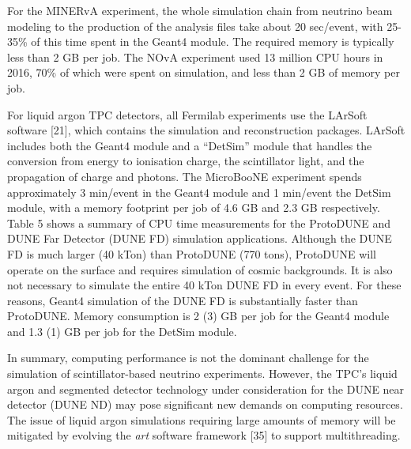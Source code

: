 \documentclass[12pt,a4paper]{article}
\begin{document}
For the MINERvA experiment, the whole simulation chain from neutrino
beam modeling to the production of the analysis files take about 20
sec/event, with 25-35\% of this time spent in the Geant4 module. The
required memory is typically less than 2 GB per job. The NOvA experiment
used 13 million CPU hours in 2016, 70\% of which were spent on
simulation, and less than 2 GB of memory per job.

For liquid argon TPC detectors, all Fermilab experiments use the LArSoft
software {[}21{]}, which contains the simulation and reconstruction
packages. LArSoft includes both the Geant4 module and a ``DetSim''
module that handles the conversion from energy to ionisation charge, the
scintillator light, and the propagation of charge and photons. The
MicroBooNE experiment spends approximately 3 min/event in the Geant4
module and 1 min/event the DetSim module, with a memory footprint per
job of 4.6 GB and 2.3 GB respectively. Table 5 shows a summary of CPU
time measurements for the ProtoDUNE and DUNE Far Detector (DUNE FD)
simulation applications. Although the DUNE FD is much larger (40 kTon)
than ProtoDUNE (770 tons), ProtoDUNE will operate on the surface and
requires simulation of cosmic backgrounds. It is also not necessary to
simulate the entire 40 kTon DUNE FD in every event. For these reasons,
Geant4 simulation of the DUNE FD is substantially faster than ProtoDUNE.
Memory consumption is 2 (3) GB per job for the Geant4 module and 1.3 (1)
GB per job for the DetSim module.

In summary, computing performance is not the dominant challenge for the
simulation of scintillator-based neutrino experiments. However, the
TPC's liquid argon and segmented detector technology under consideration
for the DUNE near detector (DUNE ND) may pose significant new demands on
computing resources. The issue of liquid argon simulations requiring
large amounts of memory will be mitigated by evolving the \emph{art}
software framework {[}35{]} to support multithreading.
\end{document}
